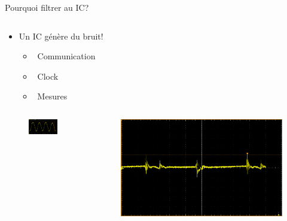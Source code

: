 \begin{frame}{Pourquoi filtrer au IC?}
\begin{columns}
\begin{column}{0.5\textwidth}
            \vspace{-24pt}
            \begin{itemize}
                \item Un IC génère du bruit!
                \begin{itemize}
                    \item[] \textcolor{UDSgreenFierte}{\faNetworkWired} 
                        ~Communication
                    \item[] \textcolor{UDSgreenFierte}{\faWaveSquare} 
                        ~Clock
                    \item[] \textcolor{UDSgreenFierte}{\faRuler} 
                        ~Mesures
                \end{itemize}
            \end{itemize}
        \end{column}
    \end{columns}
    \vspace{-12pt}
    \begin{columns}
        \begin{column}{0.45\textwidth}
            \begin{figure}
                \includegraphics[width=0.9\textwidth, height=0.75\textheight, keepaspectratio]{pictures/oscilloscope-noise.png}
            \end{figure}
        \end{column}
        \begin{column}{0.45\textwidth}
            \begin{figure}
                \includegraphics[width=\textwidth, height=0.55\textheight, keepaspectratio]{pictures/ic-noise.png}

\end{figure}
\end{column}
\end{columns}
\end{frame}
